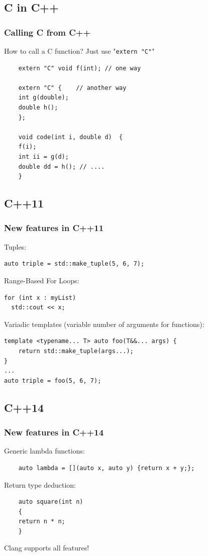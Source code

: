 \documentclass[compress]{beamer}
\begin{document}
\subsection{C in C++}
\begin{frame}[fragile]
	\frametitle{Calling C from C++}
	\begin{exampleblock}{How to call a C function?}
		Just use "\texttt{extern "C"}"
	\end{exampleblock}
	\begin{lstlisting}
	extern "C" void f(int);	// one way
	
	extern "C" {	// another way
	int g(double);
	double h();
	};
	
	void code(int i, double d) 	{
	f(i);
	int ii = g(d);
	double dd = h(); // ....
	}
	\end{lstlisting}
\end{frame}

\subsection{C++11}
\begin{frame}[fragile]
	\frametitle{New features in C++11}
Tuples:
\begin{lstlisting}
auto triple = std::make_tuple(5, 6, 7);
\end{lstlisting}

Range-Based For Loops:
\begin{lstlisting}
for (int x : myList)
  std::cout << x;
\end{lstlisting}

Variadic templates (variable number of arguments for functions):
\begin{lstlisting}
template <typename... T> auto foo(T&&... args) {
	return std::make_tuple(args...);
}
...
auto triple = foo(5, 6, 7);
\end{lstlisting}

\end{frame}


\subsection{C++14}
\begin{frame}[fragile]
	\frametitle{New features in C++14}
	Generic lambda functions:
	\begin{lstlisting}
	auto lambda = [](auto x, auto y) {return x + y;};
	\end{lstlisting}
	
	Return type deduction:
	\begin{lstlisting}
	auto square(int n) 
	{
	return n * n;
	}
	\end{lstlisting}
	
	Clang supports all features!
\end{frame}
\end{document}
